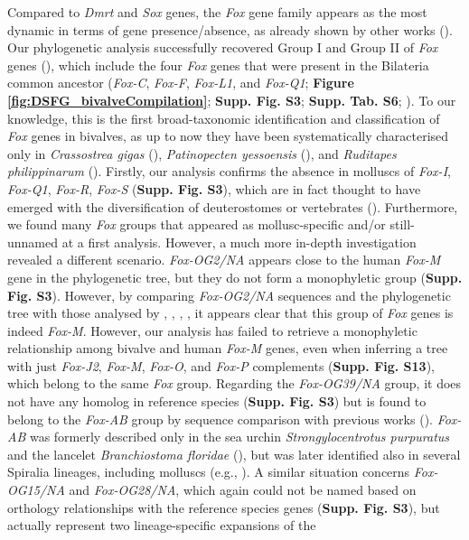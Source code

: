 \documentclass[../main.tex]{subfiles}
\begin{document}
Compared to \textit{Dmrt} and \textit{Sox} genes, the \textit{Fox} gene family appears as the most dynamic in terms of gene presence/absence, as already shown by other works (\textbf{\cite{wu2020identification,schomburg2022phylogenetic,seudre2022fox}}). Our phylogenetic analysis successfully recovered Group I and Group II of \textit{Fox} genes (\textbf{\cite{larroux2008genesis}}), which include the four \textit{Fox} genes that were present in the Bilateria common ancestor (\textit{Fox-C}, \textit{Fox-F}, \textit{Fox-L1}, and \textit{Fox-Q1}; \textbf{Figure \ref{fig:DSFG_bivalveCompilation}}; \textbf{Supp. Fig. S3}; \textbf{Supp. Tab. S6}; \textbf{\cite{shimeld2010clustered}}). To our knowledge, this is the first broad-taxonomic identification and classification of \textit{Fox} genes in bivalves, as up to now they have been systematically characterised only in \textit{Crassostrea gigas} (\textbf{\cite{yang2014phylogeny}}), \textit{Patinopecten yessoensis} (\textbf{\cite{wu2020identification}}), and \textit{Ruditapes philippinarum} (\textbf{\cite{liu2024characterization}}). Firstly, our analysis confirms the absence in molluscs of \textit{Fox-I}, \textit{Fox-Q1}, \textit{Fox-R}, \textit{Fox-S} (\textbf{Supp. Fig. S3}), which are in fact thought to have emerged with the diversification of deuterostomes or vertebrates (\textbf{\cite{yang2014phylogeny,wu2020identification,schomburg2022phylogenetic,seudre2022fox}}). Furthermore, we found many \textit{Fox} groups that appeared as mollusc-specific and/or still-unnamed at a first analysis. However, a much more in-depth investigation revealed a different scenario. \textit{Fox-OG2/NA} appears close to the human \textit{Fox-M} gene in the phylogenetic tree, but they do not form a monophyletic group (\textbf{Supp. Fig. S3}). However, by comparing \textit{Fox-OG2/NA} sequences and the phylogenetic tree with those analysed by \textbf{\cite{yang2014phylogeny}}, \textbf{\cite{wu2020identification}}, \textbf{\cite{schomburg2022phylogenetic}}, \textbf{\cite{seudre2022fox}}, it appears clear that this group of \textit{Fox} genes is indeed \textit{Fox-M}. However, our analysis has failed to retrieve a monophyletic relationship among bivalve and human \textit{Fox-M} genes, even when inferring a tree with just \textit{Fox-J2}, \textit{Fox-M}, \textit{Fox-O}, and \textit{Fox-P} complements (\textbf{Supp. Fig. S13}), which belong to the same \textit{Fox} group. Regarding the \textit{Fox-OG39/NA} group, it does not have any homolog in reference species (\textbf{Supp. Fig. S3}) but is found to belong to the \textit{Fox-AB} group by sequence comparison with previous works (\textbf{\cite{yang2014phylogeny,wu2020identification,seudre2022fox}}). \textit{Fox-AB} was formerly described only in the sea urchin \textit{Strongylocentrotus purpuratus} and the lancelet \textit{Branchiostoma floridae} (\textbf{\cite{yu2008fox,tu2006sea}}), but was later identified also in several Spiralia lineages, including molluscs (e.g., \textbf{\cite{yang2014phylogeny,wu2020identification,seudre2022fox}}). A similar situation concerns \textit{Fox-OG15/NA} and \textit{Fox-OG28/NA}, which again could not be named based on orthology relationships with the reference species genes (\textbf{Supp. Fig. S3}), but actually represent two lineage-specific expansions of the 
\end{document}
